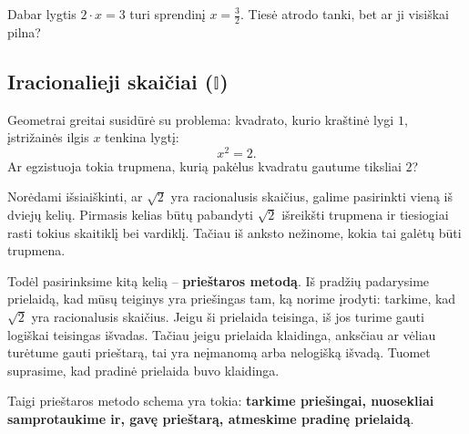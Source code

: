 \documentclass[11pt,a4paper]{scrartcl}
\begin{document}
\begin{center}
\end{center}

Dabar lygtis $2 \cdot x = 3$ turi sprendinį $x = \frac{3}{2}$. Tiesė atrodo tanki, bet ar ji visiškai pilna?

\subsection{Iracionalieji skaičiai ($\mathbb{I}$)}

Geometrai greitai susidūrė su problema: kvadrato, kurio kraštinė lygi $1$, įstrižainės ilgis $x$ tenkina lygtį:
\[ x^2 = 2. \]
Ar egzistuoja tokia trupmena, kurią pakėlus kvadratu gautume tiksliai $2$? 

Norėdami išsiaiškinti, ar $\sqrt{2}$ yra racionalusis skaičius, galime pasirinkti vieną iš dviejų kelių. Pirmasis kelias būtų pabandyti $\sqrt{2}$ išreikšti trupmena ir tiesiogiai rasti tokius skaitiklį bei vardiklį. Tačiau iš anksto nežinome, kokia tai galėtų būti trupmena.

Todėl pasirinksime kitą kelią -- \textbf{prieštaros metodą}. Iš pradžių padarysime prielaidą, kad mūsų teiginys yra priešingas tam, ką norime įrodyti: tarkime, kad $\sqrt{2}$ yra racionalusis skaičius. Jeigu ši prielaida teisinga, iš jos turime gauti logiškai teisingas išvadas. Tačiau jeigu prielaida klaidinga, anksčiau ar vėliau turėtume gauti prieštarą, tai yra neįmanomą arba nelogišką išvadą. Tuomet suprasime, kad pradinė prielaida buvo klaidinga.

Taigi prieštaros metodo schema yra tokia: \textbf{tarkime priešingai, nuosekliai samprotaukime ir, gavę prieštarą, atmeskime pradinę prielaidą}.
\end{document}
